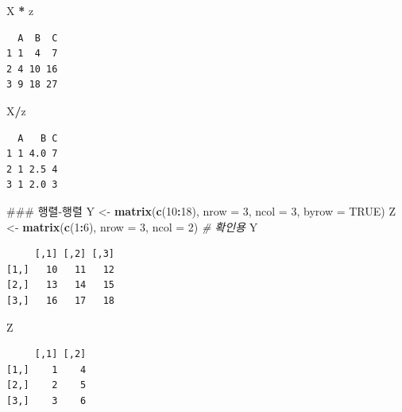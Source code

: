 \documentclass[11pt,a4paper]{book}
\newenvironment{Shaded}{\begin{snugshade}}{\end{snugshade}}
\newcommand{\KeywordTok}[1]{\textcolor[rgb]{0.13,0.29,0.53}{\textbf{#1}}}
\newcommand{\DataTypeTok}[1]{\textcolor[rgb]{0.13,0.29,0.53}{#1}}
\newcommand{\DecValTok}[1]{\textcolor[rgb]{0.00,0.00,0.81}{#1}}
\newcommand{\StringTok}[1]{\textcolor[rgb]{0.31,0.60,0.02}{#1}}
\newcommand{\CommentTok}[1]{\textcolor[rgb]{0.56,0.35,0.01}{\textit{#1}}}
\newcommand{\OtherTok}[1]{\textcolor[rgb]{0.56,0.35,0.01}{#1}}
\newcommand{\OperatorTok}[1]{\textcolor[rgb]{0.81,0.36,0.00}{\textbf{#1}}}
\newcommand{\NormalTok}[1]{#1}
\theoremstyle{definition}
\theoremstyle{definition}
\theoremstyle{definition}
\theoremstyle{remark}
\begin{document}
\begin{Shaded}
\begin{Highlighting}[]
\NormalTok{X }\OperatorTok{*}\StringTok{ }\NormalTok{z}
\end{Highlighting}
\end{Shaded}

\begin{verbatim}
  A  B  C
1 1  4  7
2 4 10 16
3 9 18 27
\end{verbatim}

\begin{Shaded}
\begin{Highlighting}[]
\NormalTok{X}\OperatorTok{/}\NormalTok{z}
\end{Highlighting}
\end{Shaded}

\begin{verbatim}
  A   B C
1 1 4.0 7
2 1 2.5 4
3 1 2.0 3
\end{verbatim}

\begin{Shaded}
\begin{Highlighting}[]
\NormalTok{### 행렬-행렬}
\NormalTok{Y <-}\StringTok{ }\KeywordTok{matrix}\NormalTok{(}\KeywordTok{c}\NormalTok{(}\DecValTok{10}\OperatorTok{:}\DecValTok{18}\NormalTok{), }\DataTypeTok{nrow =} \DecValTok{3}\NormalTok{, }\DataTypeTok{ncol =} \DecValTok{3}\NormalTok{, }\DataTypeTok{byrow =} \OtherTok{TRUE}\NormalTok{)}
\NormalTok{Z <-}\StringTok{ }\KeywordTok{matrix}\NormalTok{(}\KeywordTok{c}\NormalTok{(}\DecValTok{1}\OperatorTok{:}\DecValTok{6}\NormalTok{), }\DataTypeTok{nrow =} \DecValTok{3}\NormalTok{, }\DataTypeTok{ncol =} \DecValTok{2}\NormalTok{)  }\CommentTok{# 확인용}
\NormalTok{Y}
\end{Highlighting}
\end{Shaded}

\begin{verbatim}
     [,1] [,2] [,3]
[1,]   10   11   12
[2,]   13   14   15
[3,]   16   17   18
\end{verbatim}

\begin{Shaded}
\begin{Highlighting}[]
\NormalTok{Z}
\end{Highlighting}
\end{Shaded}

\begin{verbatim}
     [,1] [,2]
[1,]    1    4
[2,]    2    5
[3,]    3    6
\end{verbatim}
\end{document}
